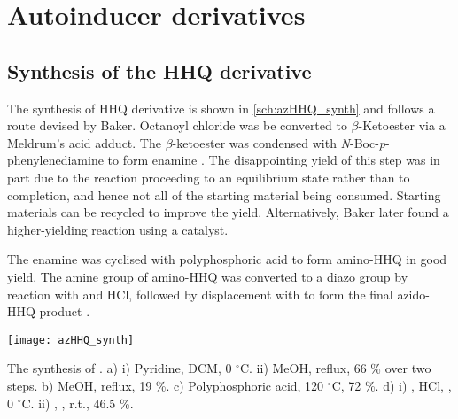 \section{Autoinducer derivatives}

\subsection{Synthesis of the HHQ derivative}

The synthesis of HHQ derivative  is shown in \ref{sch:azHHQ_synth} and follows a route devised by Baker\cite{Baker2015}. Octanoyl chloride  was be converted to $\beta$-Ketoester  via a Meldrum's acid adduct\cite{Baker2012,Scribner1978}. The $\beta$-ketoester  was condensed with \textit{N}-Boc-\textit{p}-phenylenediamine  to form enamine . The disappointing yield of this step was in part due to the reaction proceeding to an equilibrium state rather than to completion, and hence not all of the starting material being consumed. Starting materials can be recycled to improve the yield. Alternatively, Baker later found a higher-yielding reaction using a  catalyst.

The enamine  was cyclised with polyphosphoric acid to form amino-HHQ  in good yield. The amine group of amino-HHQ  was converted to a diazo group by reaction with  and HCl, followed by displacement with  to form the final azido-HHQ product \cite{Xu2013}.

\begin{scheme}[H]
	\begin{center}
		\texttt{[image: azHHQ\_synth]}
		\caption{The synthesis of . 
		a) i) Pyridine, DCM, 0 $^{\circ}$C. ii) MeOH, reflux, 66 \% over two steps. 
		b) MeOH, reflux, 19 \%. 
		c) Polyphosphoric acid, 120 $^{\circ}$C, 72 \%. 
		d) i) , HCl, , 0 $^{\circ}$C. ii) , , r.t., 46.5 \%.
		\label{sch:azHHQ_synth}}
	\end{center}
\end{scheme}


